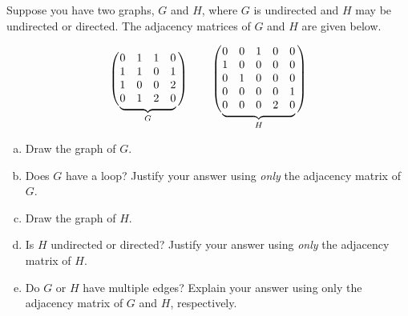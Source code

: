 \documentclass[11pt,letterpaper]{article}
\begin{document}
\newpage



 Suppose you have two graphs, $G$ and $H$, where $G$ is undirected and $H$ may be undirected or directed. The adjacency matrices of $G$ and $H$ are given below. \par
	\def\matrixG{%
	\begin{matrix}
	0 & 1 & 1 & 0 \\
	1 & 1 & 0 & 1 \\
	1 & 0 & 0 & 2 \\
	0 & 1 & 2 & 0 
	\end{matrix}
	}%
	\def\matrixH{%
	\begin{matrix}
	0 & 0 & 1 & 0 & 0 \\
	1 & 0 & 0 & 0 & 0 \\
	0 & 1 & 0 & 0 & 0 \\
	0 & 0 & 0 & 0 & 1 \\
	0 & 0 & 0 & 2 & 0 
	\end{matrix}
	}%
	\[
	\left(\vphantom{\matrixG} \right.\kern-2\nulldelimiterspace
  \underbrace{\matrixG}_{G} \kern-\nulldelimiterspace\left.\vphantom{\matrixG} \right) \qquad
  	\left(\vphantom{\matrixH} \right.\kern-2\nulldelimiterspace
  \underbrace{\matrixH}_{H} \kern-\nulldelimiterspace\left.\vphantom{\matrixH} \right)
	\]

\begin{enumerate}[(a)]
\item Draw the graph of $G$.
\item Does $G$ have a loop? Justify your answer using \textit{only} the adjacency matrix of $G$.
\item Draw the graph of $H$.
\item Is $H$ undirected or directed? Justify your answer using \textit{only} the adjacency matrix of $H$.
\item Do $G$ or $H$ have multiple edges? Explain your answer using only the adjacency matrix of $G$ and $H$, respectively. 
\end{enumerate} \pspace
\end{document}
